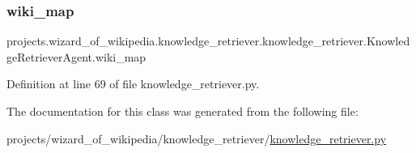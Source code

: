 \subsubsection{\texorpdfstring{wiki\+\_\+map}{wiki\_map}}
{\footnotesize\ttfamily projects.\+wizard\+\_\+of\+\_\+wikipedia.\+knowledge\+\_\+retriever.\+knowledge\+\_\+retriever.\+Knowledge\+Retriever\+Agent.\+wiki\+\_\+map}



Definition at line 69 of file knowledge\+\_\+retriever.\+py.



The documentation for this class was generated from the following file\+:\begin{DoxyCompactItemize}
\item 
projects/wizard\+\_\+of\+\_\+wikipedia/knowledge\+\_\+retriever/\hyperlink{projects_2wizard__of__wikipedia_2knowledge__retriever_2knowledge__retriever_8py}{knowledge\+\_\+retriever.\+py}\end{DoxyCompactItemize}

